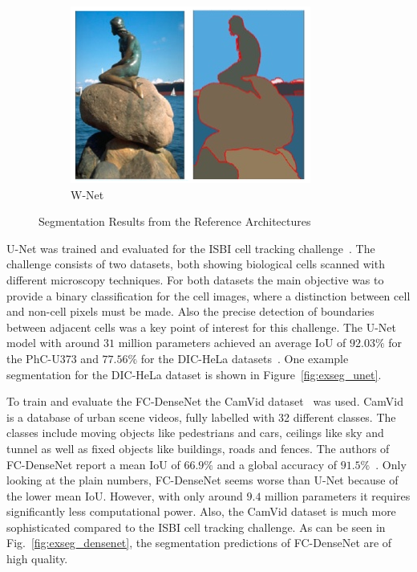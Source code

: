 \begin{figure}
\begin{subfigure}{0.21\textwidth}
        \includegraphics[width=\textwidth]{images/segmentation_example_wnet}
        \caption{W-Net~\cite{wnet17}}
        \label{fig:exseg_wnet}
    \end{subfigure}
    \hfill
    \caption{Segmentation Results from the Reference Architectures}
    \label{fig:segmentation_examples}
\end{figure}

U-Net was trained and evaluated for the ISBI cell tracking challenge~\cite{isbi_challenge12}. The challenge consists of two datasets, both showing biological cells scanned with different microscopy techniques. For both datasets the main objective was to provide a binary classification for the cell images, where a distinction between cell and non-cell pixels must be made. Also the precise detection of boundaries between adjacent cells was a key point of interest for this challenge. The U-Net model with around $31$ million parameters achieved an average IoU of $92.03\%$ for the PhC-U373 and $77.56\%$ for the DIC-HeLa datasets~\cite{unet15}. One example segmentation for the DIC-HeLa dataset is shown in Figure~\ref{fig:exseg_unet}.

To train and evaluate the FC-DenseNet the CamVid dataset~\cite{camvid_challenge} was used. CamVid is a database of urban scene videos, fully labelled with 32 different classes. The classes include moving objects like pedestrians and cars, ceilings like sky and tunnel as well as fixed objects like buildings, roads and fences. The authors of FC-DenseNet report a mean IoU of $66.9\%$ and a global accuracy of $91.5\%$~\cite{denseseg17}. Only looking at the plain numbers, FC-DenseNet seems worse than U-Net because of the lower mean IoU. However, with only around $9.4$ million parameters it requires significantly less computational power. Also, the CamVid dataset is much more sophisticated compared to the ISBI cell tracking challenge. As can be seen in Fig.~\ref{fig:exseg_densenet}, the segmentation predictions of FC-DenseNet are of high quality.

